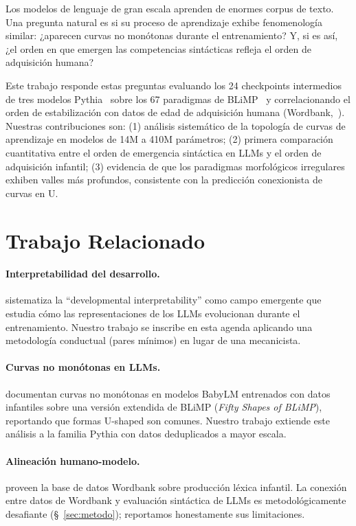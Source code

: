 \documentclass[11pt]{article}
\begin{document}
Los modelos de lenguaje de gran escala aprenden de enormes corpus de texto. Una pregunta natural es si su proceso de aprendizaje exhibe fenomenología similar: ¿aparecen curvas no monótonas durante el entrenamiento? Y, si es así, ¿el orden en que emergen las competencias sintácticas refleja el orden de adquisición humana?

Este trabajo responde estas preguntas evaluando los 24 checkpoints intermedios de tres modelos Pythia~\cite{biderman2023pythia} sobre los 67 paradigmas de BLiMP~\cite{warstadt2020blimp} y correlacionando el orden de estabilización con datos de edad de adquisición humana (Wordbank,~\citealt{frank2017wordbank}). Nuestras contribuciones son: (1) análisis sistemático de la topología de curvas de aprendizaje en modelos de 14M a 410M parámetros; (2) primera comparación cuantitativa entre el orden de emergencia sintáctica en LLMs y el orden de adquisición infantil; (3) evidencia de que los paradigmas morfológicos irregulares exhiben valles más profundos, consistente con la predicción conexionista de curvas en U.

\section{Trabajo Relacionado}
\label{sec:related}

\paragraph{Interpretabilidad del desarrollo.} \citet{kendiukhov2025} sistematiza la ``developmental interpretability'' como campo emergente que estudia cómo las representaciones de los LLMs evolucionan durante el entrenamiento. Nuestro trabajo se inscribe en esta agenda aplicando una metodología conductual (pares mínimos) en lugar de una mecanicista.

\paragraph{Curvas no monótonas en LLMs.} \citet{bunzeck2024shapes} documentan curvas no monótonas en modelos BabyLM entrenados con datos infantiles sobre una versión extendida de BLiMP (\textit{Fifty Shapes of BLiMP}), reportando que formas U-shaped son comunes. Nuestro trabajo extiende este análisis a la familia Pythia con datos deduplicados a mayor escala.

\paragraph{Alineación humano-modelo.} \citet{frank2017wordbank} proveen la base de datos Wordbank sobre producción léxica infantil. La conexión entre datos de Wordbank y evaluación sintáctica de LLMs es metodológicamente desafiante (§~\ref{sec:metodo}); reportamos honestamente sus limitaciones.
\end{document}
